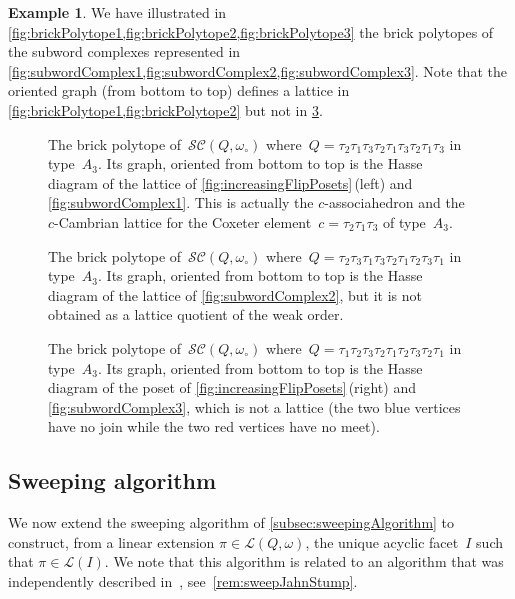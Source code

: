 \documentclass[reqno]{amsart}
\theoremstyle{definition}
\newtheorem{example}[theorem]{Example}
\newcommand{\linearExtensions}{\mathcal{L}} %
\newcommand{\wo}{\omega_\circ} %
\newcommand{\subwordComplex}{\mathcal{SC}} %
\begin{document}
\begin{example}
We have illustrated in \cref{fig:brickPolytope1,fig:brickPolytope2,fig:brickPolytope3} the brick polytopes of the subword complexes represented in \cref{fig:subwordComplex1,fig:subwordComplex2,fig:subwordComplex3}.
Note that the oriented graph (from bottom to top) defines a lattice in \cref{fig:brickPolytope1,fig:brickPolytope2} but not in \cref{fig:brickPolytope3}.
%
\begin{figure}[p]
	\centerline{}
	\caption{The brick polytope of~$\subwordComplex(Q,\wo)$ where~$Q = \tau_2 \tau_1 \tau_3 \tau_2 \tau_1 \tau_3 \tau_2 \tau_1 \tau_3$ in type~$A_3$. Its graph, oriented from bottom to top is the Hasse diagram of the lattice of \cref{fig:increasingFlipPosets}\,(left) and \cref{fig:subwordComplex1}. This is actually the $c$-associahedron and the $c$-Cambrian lattice for the Coxeter element~$c = \tau_2\tau_1\tau_3$ of type~$A_3$.}
	\label{fig:brickPolytope1}
\end{figure}
%
\begin{figure}[p]
	\centerline{}
	\caption{The brick polytope of~$\subwordComplex(Q,\wo)$ where~$Q = \tau_2 \tau_3 \tau_1 \tau_3 \tau_2 \tau_1 \tau_2 \tau_3 \tau_1$ in type~$A_3$. Its graph, oriented from bottom to top is the Hasse diagram of the lattice of \cref{fig:subwordComplex2}, but it is not obtained as a lattice quotient of the weak order.}
	\label{fig:brickPolytope2}
\end{figure}
%
\begin{figure}[p]
	\centerline{}
	\caption{The brick polytope of~$\subwordComplex(Q,\wo)$ where~$Q = \tau_1 \tau_2 \tau_3 \tau_2 \tau_1 \tau_2 \tau_3 \tau_2 \tau_1$ in type~$A_3$. Its graph, oriented from bottom to top is the Hasse diagram of the poset of \cref{fig:increasingFlipPosets}\,(right) and \cref{fig:subwordComplex3}, which is not a lattice (the two blue vertices have no join while the two red vertices have no meet).}
	\label{fig:brickPolytope3}
\end{figure}
\end{example}


\subsection{Sweeping algorithm}
\label{subsec:sweepingAlgorithmSubwordComplexes}

We now extend the sweeping algorithm of \cref{subsec:sweepingAlgorithm} to construct, from a linear extension $\pi \in \linearExtensions(Q,\omega)$, the unique acyclic facet~$I$ such that $\pi \in \linearExtensions(I)$.
We note that this algorithm is related to an algorithm that was independently described in~\cite{JahnStump}, see~\cref{rem:sweepJahnStump}.
\end{document}
